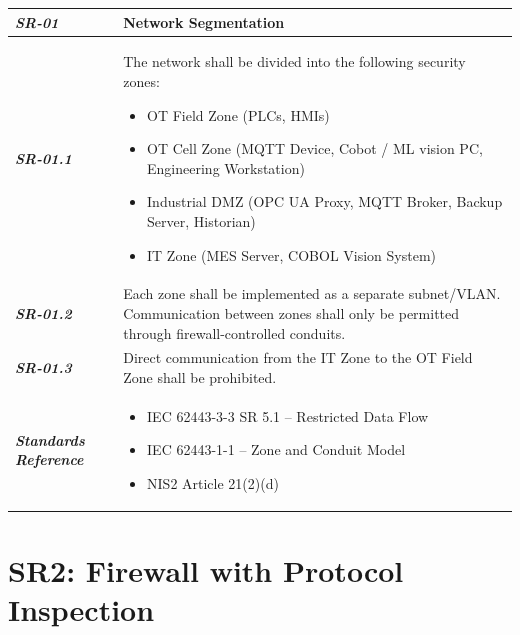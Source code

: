 \documentclass{report}
\begin{document}
\begin{tabularx}
{\textwidth}{>{\bfseries}p{2.5cm} X}
\textit{SR-01} & \textbf{Network Segmentation} \vspace{0.5em}\\
\toprule
\textit{SR-01.1} &
The network shall be divided into the following security zones:
\begin{itemize}[label=-, itemsep=0pt, topsep=2pt]
    \item OT Field Zone (PLCs, HMIs)
    \item OT Cell Zone (MQTT Device, Cobot / ML vision PC, Engineering Workstation)
    \item Industrial DMZ (OPC UA Proxy, MQTT Broker, Backup Server, Historian)
    \item IT Zone (MES Server, COBOL Vision System)
\end{itemize} \vspace{0.5em}
\\
\textit{SR-01.2} &
Each zone shall be implemented as a separate subnet/VLAN.
Communication between zones shall only be permitted through
    firewall-controlled conduits. \vspace{0.5em}
\\
\textit{SR-01.3} &
Direct communication from the IT Zone to the OT Field Zone
    shall be prohibited. \vspace{0.5em}
\\
\midrule
    \textit{Standards Reference} &
\begin{itemize}[label=-, noitemsep, topsep=0pt, leftmargin=*]
    \item IEC 62443-3-3 SR 5.1 -- Restricted Data Flow
    \item IEC 62443-1-1 -- Zone and Conduit Model
    \item NIS2 Article 21(2)(d)
\end{itemize} \vspace{1em} \\ 
\end{tabularx}
\vspace{2em}

\section{SR2: Firewall with Protocol Inspection}\label{SR2:firewall}
\end{document}

